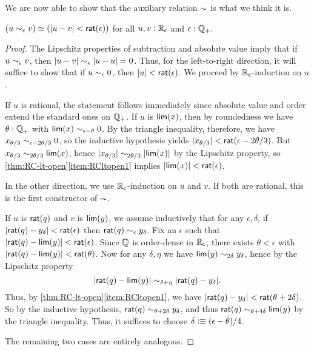 We are now able to show that the auxiliary relation $\mathord\sim$ is what we think it is.

\begin{thm} \label{RC-sim-eqv-le}
  $(u \sim_{\epsilon} v) \simeq (|u - v| < \mathsf{rat}(\epsilon))$
  for all $u, v : \mathbb{R}_\mathsf{c}$ and $\epsilon : \mathbb{Q}_{+}$.
\end{thm}
\begin{proof}
  The Lipschitz properties of subtraction and absolute value imply that if $u\sim_{\epsilon} v$, then $|u-v| \sim_{\epsilon} |u-u| = 0$.
  Thus, for the left-to-right direction, it will suffice to show that if $u\sim_{\epsilon} 0$, then $|u|<\mathsf{rat}(\epsilon)$.
  We proceed by $\mathbb{R}_\mathsf{c}$-induction on $u$.

  If $u$ is rational, the statement follows immediately since absolute value and order extend the standard ones on $\mathbb{Q}_{+}$.
  If $u$ is $\mathsf{lim}(x)$, then by roundedness we have $\theta:\mathbb{Q}_{+}$ with $\mathsf{lim}(x)\sim_{\epsilon-\theta} 0$.
  By the triangle inequality, therefore, we have $x_{\theta/3} \sim_{\epsilon-2\theta/3} 0$, so the inductive hypothesis yields $|x_{\theta/3}|<\mathsf{rat}(\epsilon-2\theta/3)$.
  But $x_{\theta/3} \sim_{2\theta/3} \mathsf{lim}(x)$, hence $|x_{\theta/3}| \sim_{2\theta/3} |\mathsf{lim}(x)|$ by the Lipschitz property, so \autoref{thm:RC-lt-open}\ref{item:RCltopen1} implies $|\mathsf{lim}(x)|<\mathsf{rat}(\epsilon)$.

  In the other direction, we use $\mathbb{R}_\mathsf{c}$-induction on $u$ and $v$.
  If both are rational, this is the first constructor of $\mathord\sim$.

  If $u$ is $\mathsf{rat}(q)$ and $v$ is $\mathsf{lim}(y)$, we assume inductively that for any $\epsilon,\delta$, if $|\mathsf{rat}(q)-y_\delta|<\mathsf{rat}(\epsilon)$ then $\mathsf{rat}(q) \sim_{\epsilon} y_\delta$.
  Fix an $\epsilon$ such that $|\mathsf{rat}(q) - \mathsf{lim}(y)|<\mathsf{rat}(\epsilon)$.
  Since $\mathbb{Q}$ is order-dense in $\mathbb{R}_\mathsf{c}$, there exists $\theta<\epsilon$ with $|\mathsf{rat}(q) - \mathsf{lim}(y)|<\mathsf{rat}(\theta)$.
  Now for any $\delta,\eta$ we have $\mathsf{lim}(y)\sim_{2\delta} y_\delta$, hence by the Lipschitz property
  \[ |\mathsf{rat}(q) - \mathsf{lim}(y)| \sim_{\delta+\eta} |\mathsf{rat}(q) - y_\delta|. \]
  Thus, by \autoref{thm:RC-lt-open}\ref{item:RCltopen1}, we have $|\mathsf{rat}(q) - y_\delta| < \mathsf{rat}(\theta+2\delta)$.
  So by the inductive hypothesis, $\mathsf{rat}(q) \sim_{\theta+2\delta} y_\delta$, and thus $\mathsf{rat}(q)\sim_{\theta+4\delta} \mathsf{lim}(y)$ by the triangle inequality.
  Thus, it suffices to choose $\delta \vcentcolon\equiv (\epsilon-\theta)/4$.

  The remaining two cases are entirely analogous.
\end{proof}

